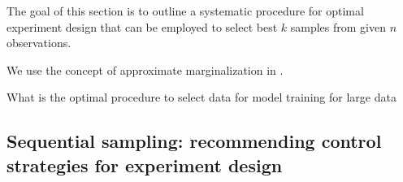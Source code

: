 The goal of this section is to outline a systematic procedure for optimal experiment design that can be employed to select best $k$ samples from given $n$ observations.

We use the concept of approximate marginalization in \cite{Garnett2013}.

What is the optimal procedure to select data for model training for large data

\begin{figure}[h!]
	\centering
	\caption{}
	\captionsetup{justification=centering}
	\label{F:}
\end{figure}

\subsection{Sequential sampling: recommending control strategies for experiment design }


\begin{figure}[h!]
	\centering
	\caption{}
	\captionsetup{justification=centering}
	\label{F:}
\end{figure}

